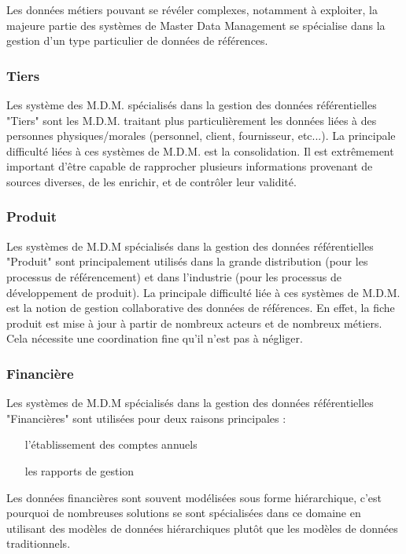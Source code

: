 Les données métiers pouvant se révéler complexes, notamment à exploiter, la majeure partie des systèmes de Master Data Management se spécialise dans la gestion d'un type particulier de données de références.

\subsubsection{Tiers}

Les système des M.D.M. spécialisés dans la gestion des données référentielles "Tiers" sont les M.D.M. traitant plus particulièrement les données liées à des personnes physiques/morales (personnel, client, fournisseur, etc...).
La principale difficulté liées à ces systèmes de M.D.M. est la consolidation. Il est extrêmement important d'être capable de rapprocher plusieurs informations provenant de sources diverses, de les enrichir, et de contrôler leur validité.

\subsubsection{Produit}

Les systèmes de M.D.M spécialisés dans la gestion des données référentielles "Produit" sont principalement utilisés dans la grande distribution (pour les processus de référencement) et dans l'industrie (pour les processus de développement de produit).
La principale difficulté liée à ces systèmes de M.D.M. est la notion de gestion collaborative des données de références. En effet, la fiche produit est mise à jour à partir de nombreux acteurs et de nombreux métiers. Cela nécessite une coordination fine qu'il n'est pas à négliger.

\subsubsection{Financière}

Les systèmes de M.D.M spécialisés dans la gestion des données référentielles "Financières" sont utilisées pour deux raisons principales :

\begin{itemize}

\item[l'établissement des comptes annuels]
\item[les rapports de gestion]

\end{itemize}

Les données financières sont souvent modélisées sous forme hiérarchique, c'est pourquoi de nombreuses solutions se sont spécialisées dans ce domaine en utilisant des modèles de données hiérarchiques plutôt que les modèles de données traditionnels.